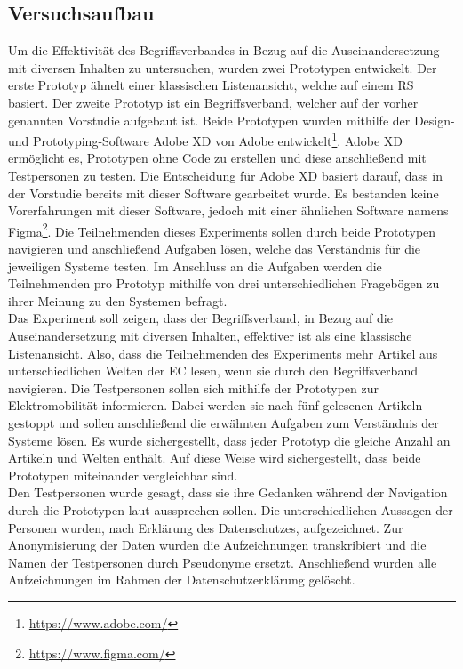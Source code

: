 \subsection{Versuchsaufbau}
Um die Effektivität des Begriffsverbandes in Bezug auf die Auseinandersetzung mit diversen Inhalten zu untersuchen, wurden zwei Prototypen entwickelt.
Der erste Prototyp ähnelt einer klassischen Listenansicht, welche auf einem \ac{RS} basiert.
Der zweite Prototyp ist ein Begriffsverband, welcher auf der vorher genannten Vorstudie aufgebaut ist.
Beide Prototypen wurden mithilfe der Design- und Prototyping-Software Adobe XD von Adobe entwickelt\footnote{\url{https://www.adobe.com/}}.
Adobe XD ermöglicht es, Prototypen ohne Code zu erstellen und diese anschließend mit Testpersonen zu testen.
Die Entscheidung für Adobe XD basiert darauf, dass in der Vorstudie bereits mit dieser Software gearbeitet wurde.
Es bestanden keine Vorerfahrungen mit dieser Software, jedoch mit einer ähnlichen Software namens Figma\footnote{\url{https://www.figma.com/}}.
Die Teilnehmenden dieses Experiments sollen durch beide Prototypen navigieren und anschließend Aufgaben lösen, welche das Verständnis für die jeweiligen Systeme testen.
Im Anschluss an die Aufgaben werden die Teilnehmenden pro Prototyp mithilfe von drei unterschiedlichen Fragebögen zu ihrer Meinung zu den Systemen befragt.\\

Das Experiment soll zeigen, dass der Begriffsverband, in Bezug auf die Auseinandersetzung mit diversen Inhalten, effektiver ist als eine klassische Listenansicht.
Also, dass die Teilnehmenden des Experiments mehr Artikel aus unterschiedlichen Welten der \ac{EC} lesen, wenn sie durch den Begriffsverband navigieren.
Die Testpersonen sollen sich mithilfe der Prototypen zur Elektromobilität informieren.
Dabei werden sie nach fünf gelesenen Artikeln gestoppt und sollen anschließend die erwähnten Aufgaben zum Verständnis der Systeme lösen.
Es wurde sichergestellt, dass jeder Prototyp die gleiche Anzahl an Artikeln und Welten enthält.
Auf diese Weise wird sichergestellt, dass beide Prototypen miteinander vergleichbar sind.\\

Den Testpersonen wurde gesagt, dass sie ihre Gedanken während der Navigation durch die Prototypen laut aussprechen sollen.
Die unterschiedlichen Aussagen der Personen wurden, nach Erklärung des Datenschutzes, aufgezeichnet.
Zur Anonymisierung der Daten wurden die Aufzeichnungen transkribiert und die Namen der Testpersonen durch Pseudonyme ersetzt.
Anschließend wurden alle Aufzeichnungen im Rahmen der Datenschutzerklärung gelöscht.\\

